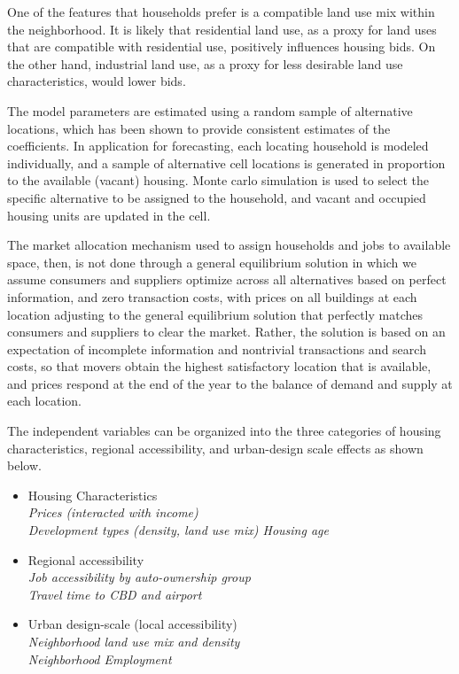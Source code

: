 One of the features that households prefer is a compatible land
use mix within the neighborhood.  It is likely that residential
land use, as a proxy for land uses that are compatible with
residential use, positively influences housing bids.   On the
other hand, industrial land use, as a proxy for less desirable
land use characteristics, would lower bids.

The model parameters are estimated using a random sample of alternative
locations, which has been shown to provide consistent estimates of
the coefficients.  In application for forecasting, each locating
household is modeled individually, and a sample of alternative
cell locations is generated in proportion to the available
(vacant) housing. Monte carlo simulation is used to select the
specific alternative to be assigned to the household, and vacant
and occupied housing units are updated in the cell.

The market allocation mechanism used to assign households and jobs
to available space, then, is not done through a general
equilibrium solution in which we assume consumers and suppliers
optimize across all alternatives based on perfect information, and
zero transaction costs, with prices on all buildings at each
location adjusting to the general equilibrium solution that
perfectly matches consumers and suppliers to clear the market.
Rather, the solution is based on an expectation of incomplete
information and nontrivial transactions and search costs, so that
movers obtain the highest satisfactory location that is available,
and prices respond at the end of the year to the balance of demand
and supply at each location.

The independent variables can be organized into the three
categories of housing characteristics, regional accessibility, and
urban-design scale effects as shown below.

\begin{itemize}

\item{Housing Characteristics} \\
\emph{Prices (interacted with income) \\
Development types (density, land use mix) Housing age}

\item{Regional accessibility} \\
\emph{Job accessibility by auto-ownership group \\
Travel time to CBD and airport}

\item{Urban design-scale (local accessibility) \\
\emph{Neighborhood land use mix and density \\
Neighborhood Employment}}

\end{itemize}

